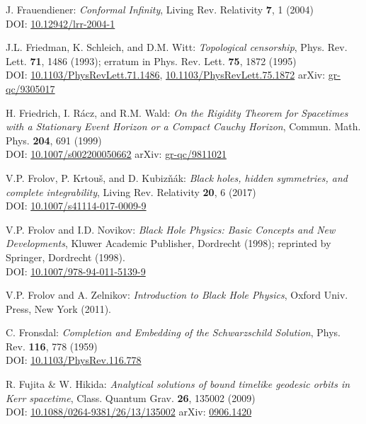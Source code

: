 \begin{thebibliography}{123}
J. Frauendiener:
{\em Conformal Infinity},
Living Rev. Relativity {\bf 7}, 1 (2004) \\
DOI: \href{https://doi.org/10.12942/lrr-2004-1}{10.12942/lrr-2004-1}

J.L. Friedman, K. Schleich, and D.M. Witt:
{\em Topological censorship},
Phys. Rev. Lett. {\bf 71}, 1486 (1993); erratum in Phys. Rev. Lett. {\bf 75}, 1872 (1995)\\
DOI: \href{https://doi.org/10.1103/PhysRevLett.71.1486}{10.1103/PhysRevLett.71.1486},
\href{https://doi.org/10.1103/PhysRevLett.75.1872}{10.1103/PhysRevLett.75.1872}\hfill
arXiv: \href{https://arxiv.org/abs/gr-qc/9305017}{gr-qc/9305017}

H. Friedrich, I. Rácz, and R.M. Wald:
{\em On the Rigidity Theorem for Spacetimes with a Stationary Event Horizon or a Compact Cauchy Horizon},
Commun. Math. Phys. {\bf 204}, 691 (1999)\\
DOI: \href{https://doi.org/10.1007/s002200050662}{10.1007/s002200050662}\hfill
arXiv: \href{https://arxiv.org/abs/gr-qc/9811021}{gr-qc/9811021}

V.P. Frolov, P. Krtouš, and D. Kubizňák:
{\em Black holes, hidden symmetries, and complete integrability},
Living Rev. Relativity {\bf 20}, 6 (2017) \\
DOI: \href{https://doi.org/10.1007/s41114-017-0009-9}{10.1007/s41114-017-0009-9}

V.P. Frolov and I.D. Novikov: {\em Black Hole Physics:
Basic Concepts and New Developments},
Kluwer Academic Publisher, Dordrecht (1998); reprinted by
Springer, Dordrecht (1998). \\
DOI: \href{https://doi.org/10.1007/978-94-011-5139-9}{10.1007/978-94-011-5139-9}

V.P. Frolov and A. Zelnikov: {\em Introduction to Black Hole Physics},
Oxford Univ. Press, New York (2011).

C. Fronsdal: {\em Completion and Embedding of the Schwarzschild Solution},
Phys. Rev. {\bf 116}, 778 (1959) \\
DOI: \href{https://doi.org/10.1103/PhysRev.116.778}{10.1103/PhysRev.116.778}

R. Fujita \& W. Hikida:
{\em Analytical solutions of bound timelike geodesic orbits in Kerr spacetime},
Class. Quantum Grav. {\bf 26}, 135002 (2009) \\
DOI: \href{https://doi.org/10.1088/0264-9381/26/13/135002}{10.1088/0264-9381/26/13/135002}\hfill
arXiv: \href{https://arxiv.org/abs/0906.1420}{0906.1420}


\end{thebibliography}
